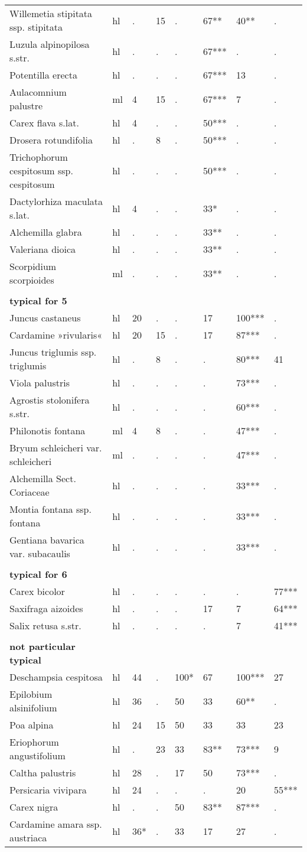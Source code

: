 \begin{longtable}{p{60mm}p{10mm}p{5mm}p{5mm}p{5mm}p{5mm}p{5mm}p{5mm}}
Willemetia stipitata ssp. stipitata&hl&.&15&.&\multicolumn{1}{|l|}{67**}&40**&.\tabularnewline
Luzula alpinopilosa s.str.&hl&.&.&.&\multicolumn{1}{|l|}{67***}&.&.\tabularnewline
Potentilla erecta&hl&.&.&.&\multicolumn{1}{|l|}{67***}&13&.\tabularnewline
Aulacomnium palustre&ml&4&15&.&\multicolumn{1}{|l|}{67***}&7&.\tabularnewline
Carex flava s.lat.&hl&4&.&.&\multicolumn{1}{|l|}{50***}&.&.\tabularnewline
Drosera rotundifolia&hl&.&8&.&\multicolumn{1}{|l|}{50***}&.&.\tabularnewline
Trichophorum cespitosum ssp. cespitosum&hl&.&.&.&\multicolumn{1}{|l|}{50***}&.&.\tabularnewline
Dactylorhiza maculata s.lat.&hl&4&.&.&\multicolumn{1}{|l|}{33*}&.&.\tabularnewline
Alchemilla glabra&hl&.&.&.&\multicolumn{1}{|l|}{33**}&.&.\tabularnewline
Valeriana dioica&hl&.&.&.&\multicolumn{1}{|l|}{33**}&.&.\tabularnewline
Scorpidium scorpioides&ml&.&.&.&\multicolumn{1}{|l|}{33**}&.&.\tabularnewline
&&&&&&&\tabularnewline
\textbf{typical for 5}&&&&&&&\tabularnewline
Juncus castaneus&hl&20&.&.&17&\multicolumn{1}{|l|}{100***}&.\tabularnewline
Cardamine »rivularis«&hl&20&15&.&17&\multicolumn{1}{|l|}{87***}&.\tabularnewline
Juncus triglumis ssp. triglumis&hl&.&8&.&.&\multicolumn{1}{|l|}{80***}&41\tabularnewline
Viola palustris&hl&.&.&.&.&\multicolumn{1}{|l|}{73***}&.\tabularnewline
Agrostis stolonifera s.str.&hl&.&.&.&.&\multicolumn{1}{|l|}{60***}&.\tabularnewline
Philonotis fontana&ml&4&8&.&.&\multicolumn{1}{|l|}{47***}&.\tabularnewline
Bryum schleicheri var. schleicheri&ml&.&.&.&.&\multicolumn{1}{|l|}{47***}&.\tabularnewline
Alchemilla Sect. Coriaceae&hl&.&.&.&.&\multicolumn{1}{|l|}{33***}&.\tabularnewline
Montia fontana ssp. fontana&hl&.&.&.&.&\multicolumn{1}{|l|}{33***}&.\tabularnewline
Gentiana bavarica var. subacaulis&hl&.&.&.&.&\multicolumn{1}{|l|}{33***}&.\tabularnewline
&&&&&&&\tabularnewline
\textbf{typical for 6}&&&&&&&\tabularnewline
Carex bicolor&hl&.&.&.&.&.&\multicolumn{1}{|l|}{77***}\tabularnewline
Saxifraga aizoides&hl&.&.&.&17&7&\multicolumn{1}{|l|}{64***}\tabularnewline
Salix retusa s.str.&hl&.&.&.&.&7&\multicolumn{1}{|l|}{41***}\tabularnewline
&&&&&&&\tabularnewline
\textbf{not particular typical}&&&&&&&\tabularnewline
Deschampsia cespitosa&hl&44&.&100*&67&100***&27\tabularnewline
Epilobium alsinifolium&hl&36&.&50&33&60**&.\tabularnewline
Poa alpina&hl&24&15&50&33&33&23\tabularnewline
Eriophorum angustifolium&hl&.&23&33&83**&73***&9\tabularnewline
Caltha palustris&hl&28&.&17&50&73***&.\tabularnewline
Persicaria vivipara&hl&24&.&.&.&20&55***\tabularnewline
Carex nigra&hl&.&.&50&83**&87***&.\tabularnewline
Cardamine amara ssp. austriaca&hl&36*&.&33&17&27&.\tabularnewline

\end{longtable}
